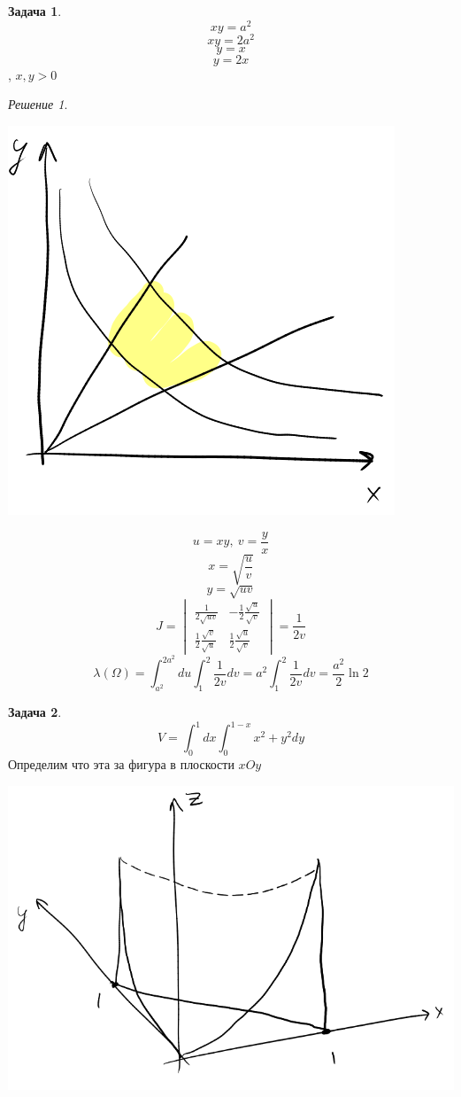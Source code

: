 \documentclass[english]{article}
\theoremstyle{plain}
\theoremstyle{remark}
\newtheorem*{solution}{Решение}
\theoremstyle{definition}
\newtheorem{task}{Задача}
\begin{document}
\begin{task}
\[ xy = a^2 \]
\[ xy = 2a^2 \]
\[ y = x \]
\[ y = 2x \]
, \(x, y > 0\)
\end{task}
\begin{solution}
\-
\begin{center}
\includegraphics[scale=0.3]{4_2.png}
\end{center}
\[ u = xy,\ v = \frac{y}{x} \]
\[ x = \sqrt{\frac{u}{v}} \]
\[ y = \sqrt{uv} \]
\[ J = \begin{vmatrix}\frac{1}{2\sqrt{uv}} & -\frac{1}{2}\frac{\sqrt{u}}{\sqrt{v}} \\ \frac{1}{2} \frac{\sqrt{v}}{\sqrt{u}} & \frac{1}{2}\frac{\sqrt{u}}{\sqrt{v}} \end{vmatrix} = \frac{1}{2v} \]
\[ \lambda(\Omega) = \int^{2a^2}_{a^2}du\int^2_1 \frac{1}{2v} dv = a^2 \int^2_1 \frac{1}{2v}dv = \frac{a^2}{2}\ln 2 \]
\end{solution}
\begin{task}
\[ V = \int^1_0 dx \int ^{1 - x}_0 x^2 + y^2 dy \]
Определим что эта за фигура в плоскости \(xOy\)
\begin{center}
\includegraphics[scale=0.5]{4_3.png}
\end{center}
\end{task}
\end{document}
